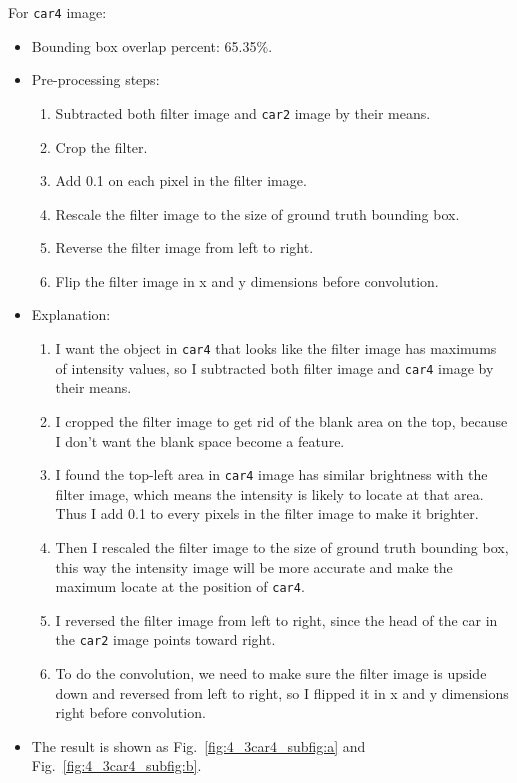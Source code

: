 \documentclass{assignment}
\begin{document}
\begin{problemlist}
For \texttt{car4} image:
\begin{itemize}
    \item Bounding box overlap percent: 65.35\%.
    \item Pre-processing steps: 
    \begin{enumerate}[label={\alph*)}]
        \item Subtracted both filter image and \texttt{car2} image by their means.
        \item Crop the filter.
        \item Add 0.1 on each pixel in the filter image.
        \item Rescale the filter image to the size of ground truth bounding box.
        \item Reverse the filter image from left to right.
        \item Flip the filter image in x and y dimensions before convolution.
    \end{enumerate}
    \item Explanation: 
    \begin{enumerate}[label={\alph*)}]
        \item I want the object in \texttt{car4} that looks like the filter image has maximums of intensity values, so I subtracted both filter image and \texttt{car4} image by their means.
        \item I cropped the filter image to get rid of the blank area on the top, because I don't want the blank space become a feature.
        \item I found the top-left area in \texttt{car4} image has similar brightness with the filter image, which  means the intensity is likely to locate at that area. Thus I add 0.1 to every pixels in the filter image to make it brighter.
        \item Then I rescaled the filter image to the size of ground truth bounding box, this way the intensity image will be more accurate and make the maximum locate at the position of \texttt{car4}.
        \item I reversed the filter image from left to right, since the head of the car in the \texttt{car2} image points toward right.
        \item To do the convolution, we need to make sure the filter image is upside down and reversed from left to right, so I flipped it in x and y dimensions right before convolution.
    \end{enumerate}
    \item The result is shown as Fig.~\ref{fig:4_3car4_subfig:a} and Fig.~\ref{fig:4_3car4_subfig:b}.
\end{itemize}


\end{problemlist}
\end{document}
